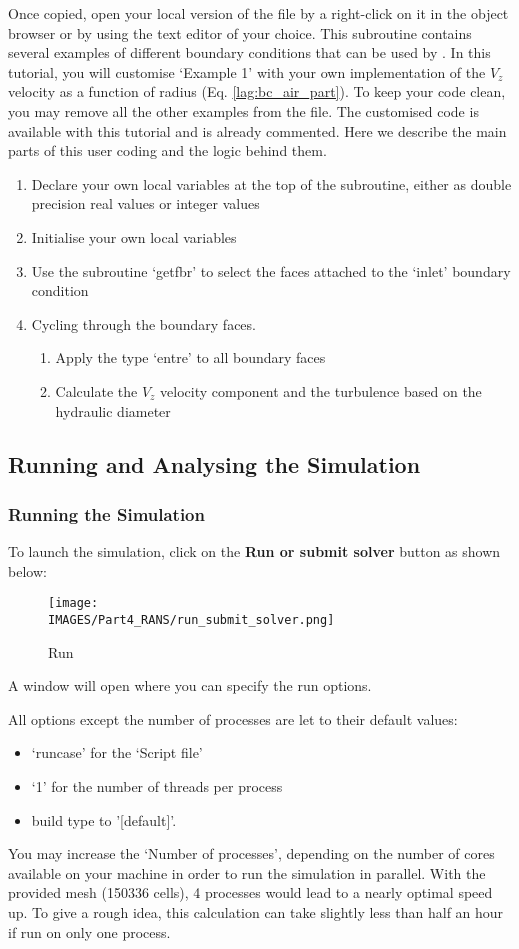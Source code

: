 Once copied, open your local version of the file by a right-click on it in the object browser or by using the text editor of your choice.  This subroutine contains several examples of different boundary conditions that can be used by \CS.  In this tutorial, you will customise ‘Example 1’ with your own implementation of the $V_z$ velocity as a function of radius (Eq. \ref{lag:bc_air_part}).  To keep your code clean, you may remove all the other examples from the file.  The customised code is available with this tutorial and is already commented.  Here we describe the main parts of this user coding and the logic behind them.
%
\begin{enumerate}
\item Declare your own local variables at the top of the subroutine, either as double precision real values or integer values
\item Initialise your own local variables
\item Use the subroutine ‘getfbr’ to select the faces attached to the ‘inlet’ boundary condition
\item Cycling through the boundary faces.
\begin{enumerate}
\item Apply the type ‘entre’ to all boundary faces
\item Calculate the $V_z$ velocity component and the turbulence based on the hydraulic diameter
\end{enumerate}
\end{enumerate}
%
\subsection{Running and Analysing the Simulation}

\subsubsection{Running the Simulation}

To launch the simulation, click on the {\color{eblue} \bf Run or submit solver} button as shown below:

\begin{figure}[H] 
\centering
\texttt{[image: \\IMAGES/Part4\_RANS/run\_submit\_solver.png]} 
\caption{Run}
\label{lag:cap1_run}
\end{figure}

A window will open where you can specify the run options.

All options except the number of processes are let to their default values:
%
\begin{itemize}
\item ‘runcase’ for the ‘Script file’
\item ‘1’ for the number of threads per process
\item build type to '[default]'.
\end{itemize}
%
You may increase the ‘Number of processes’, depending on the number of cores available on your machine in order to run the simulation in parallel.
With the provided mesh (150336 cells), 4 processes would lead to a nearly optimal speed up. To give a rough idea, this calculation can take slightly less than half an hour if run on only one process.

